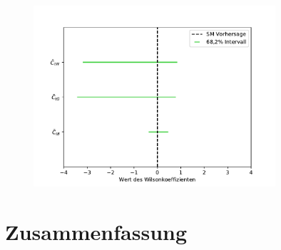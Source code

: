 \begin{figure}
    \centering
    \includegraphics[width=0.8\textwidth]{Plots/wilson.pdf}
\end{figure}
%
%
\chapter{Zusammenfassung}
